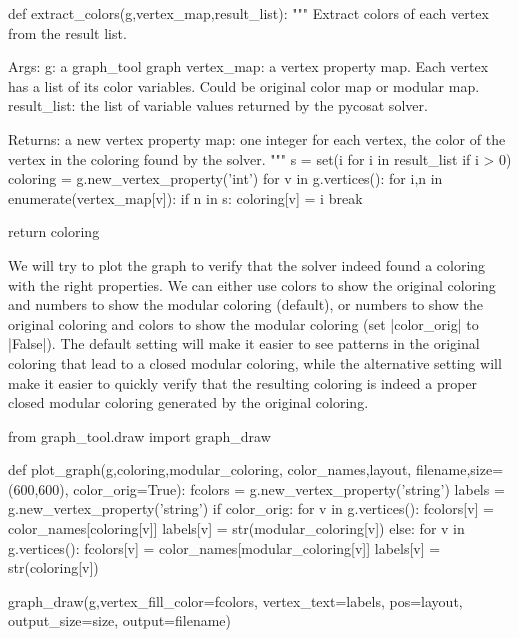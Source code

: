 \documentclass[letterpaper]{article}
\begin{document}
\begin{pyblock}
def extract_colors(g,vertex_map,result_list):
   """
   Extract colors of each vertex from the result list.

   Args:
      g: a graph_tool graph
      vertex_map: a vertex property map.  Each vertex has a list
         of its color variables. Could be original color map or
         modular map.
      result_list: the list of variable values returned by the
         pycosat solver.

   Returns:
      a new vertex property map: one integer for each vertex, the
      color of the vertex in the coloring found by the solver.
   """
   s = set(i for i in result_list if i > 0)
   coloring = g.new_vertex_property('int')
   for v in g.vertices():
      for i,n in enumerate(vertex_map[v]):
         if n in s:
            coloring[v] = i
            break

   return coloring
\end{pyblock}

We will try to plot the graph to verify that the solver indeed found a coloring
with the right properties.  We can either use colors to show the original
coloring and numbers to show the modular coloring (default), or numbers to show
the original coloring and colors to show the modular coloring (set
\pyv|color_orig| to \pyv|False|).  The default setting will make it easier to
see patterns in the original coloring that lead to a closed modular coloring,
while the alternative setting will make it easier to quickly verify that the
resulting coloring is indeed a proper closed modular coloring generated by the
original coloring.

\begin{pyblock}
from graph_tool.draw import graph_draw

def plot_graph(g,coloring,modular_coloring,
               color_names,layout,
               filename,size=(600,600),
               color_orig=True):
   fcolors = g.new_vertex_property('string')
   labels = g.new_vertex_property('string')
   if color_orig:
      for v in g.vertices():
         fcolors[v] = color_names[coloring[v]]
         labels[v] = str(modular_coloring[v])
   else:
      for v in g.vertices():
         fcolors[v] = color_names[modular_coloring[v]]
         labels[v] = str(coloring[v])

   graph_draw(g,vertex_fill_color=fcolors,
              vertex_text=labels,
              pos=layout,
              output_size=size,
              output=filename)
\end{pyblock}
\end{document}
